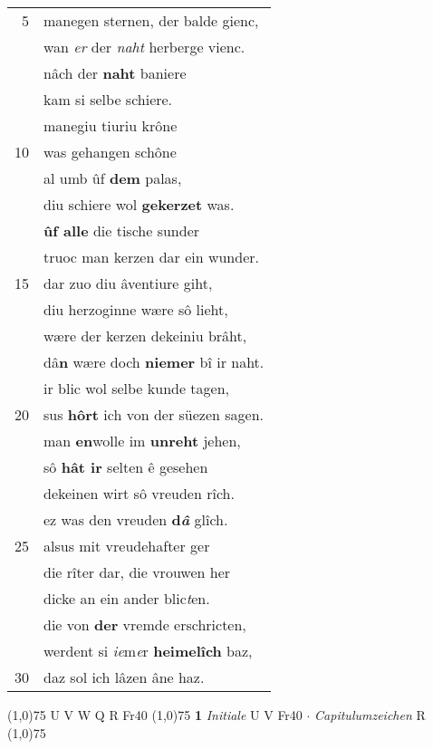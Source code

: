 \documentclass[8pt,a4paper,notitlepage]{article}
\begin{document}
\begin{table}[ht]
\begin{minipage}[t]{0.5\linewidth}
\begin{tabular}{rl}
5 & manegen sternen, der balde gienc,\\ 
 & wan \textit{er} der \textit{naht} herberge vienc.\\ 
 & nâch der \textbf{naht} baniere\\ 
 & kam si selbe schiere.\\ 
 & manegiu tiuriu krône\\ 
10 & was gehangen schône\\ 
 & al umb ûf \textbf{dem} palas,\\ 
 & diu schiere wol \textbf{gekerzet} was.\\ 
 & \textbf{ûf alle} die tische sunder\\ 
 & truoc man kerzen dar ein wunder.\\ 
15 & dar zuo diu âventiure giht,\\ 
 & diu herzoginne wære sô lieht,\\ 
 & wære der kerzen dekeiniu brâht,\\ 
 & dâ\textbf{n} wære doch \textbf{niemer} bî ir naht.\\ 
 & ir blic wol selbe kunde tagen,\\ 
20 & sus \textbf{hôrt} ich von der süezen sagen.\\ 
 & man \textbf{en}wolle im \textbf{unreht} jehen,\\ 
 & sô \textbf{hât ir} selten ê gesehen\\ 
 & dekeinen wirt sô vreuden rîch.\\ 
 & ez was den vreuden \textbf{d\textit{â}} glîch.\\ 
25 & alsus mit vreudehafter ger\\ 
 & die rîter dar, die vrouwen her\\ 
 & dicke an ein ander blic\textit{t}en.\\ 
 & die von \textbf{der} vremde erschricten,\\ 
 & werdent si \textit{ie}m\textit{e}r \textbf{heimelîch} baz,\\ 
30 & daz sol ich lâzen âne haz.\\ 
\end{tabular}
\scriptsize
\line(1,0){75} \newline
U V W Q R Fr40 \newline
\line(1,0){75} \newline
\textbf{1} \textit{Initiale} U V Fr40   $\cdot$ \textit{Capitulumzeichen} R  \newline
\line(1,0){75} \newline

\end{minipage}
\end{table}
\end{document}
